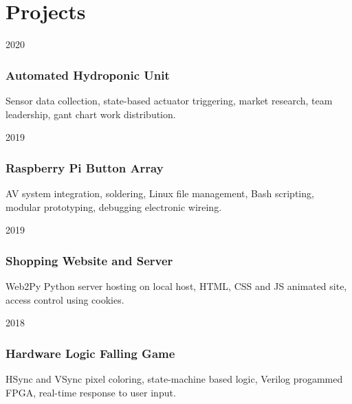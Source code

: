 \documentclass[12pt,letterpaper]{report}
\newcommand{\verticalgap}{2em}
\newcommand{\projectspace}{.75em}
\newcommand{\topandbottom}{\linewidth}
\begin{document}
	\begin{minipage}[t]{\topandbottom}
		\vspace{\verticalgap}
	\section*{Projects}
    \begin{tablist}
	\raggedright
	\item[2020] \tab \subsubsection*{Automated Hydroponic Unit}\hspace{\projectspace}Sensor data collection, state-based actuator triggering, market research, team leadership, gant chart work distribution.
    \item[2019] \tab \subsubsection*{Raspberry Pi Button Array}\hspace{\projectspace}AV system integration, soldering, Linux file management, \newline Bash scripting, modular prototyping, debugging electronic wireing.
    \item[2019] \tab \subsubsection*{Shopping Website and Server}\hspace{\projectspace}Web2Py Python server hosting on local host, HTML, CSS and JS animated site, access control using cookies.
    \item[2018] \tab \subsubsection*{Hardware Logic Falling Game}\hspace{\projectspace}HSync and VSync pixel coloring, state-machine based logic, Verilog progammed FPGA, real-time response to user input.
	\end{tablist}
	\end{minipage}
	
\end{document}
